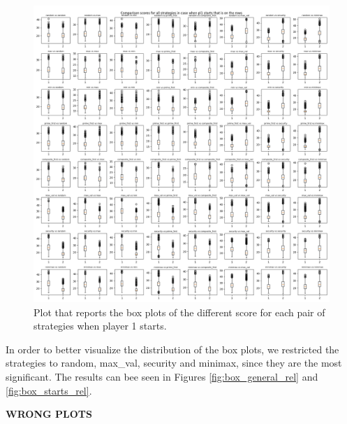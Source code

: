 \begin{figure}
	\centering
	\includegraphics[width=1\linewidth]{img/scores_p1first.png}
	\caption{Plot that reports the box plots of the different score for each pair of strategies when player 1 starts.}
	\label{fig:box_starts}
\end{figure}

In order to better visualize the distribution of the box plots, we restricted the strategies to random, max\_val, security and minimax, since they are the most significant. The results can bee seen in Figures \ref{fig:box_general_rel} and \ref{fig:box_starts_rel}.

\textbf{WRONG PLOTS}


